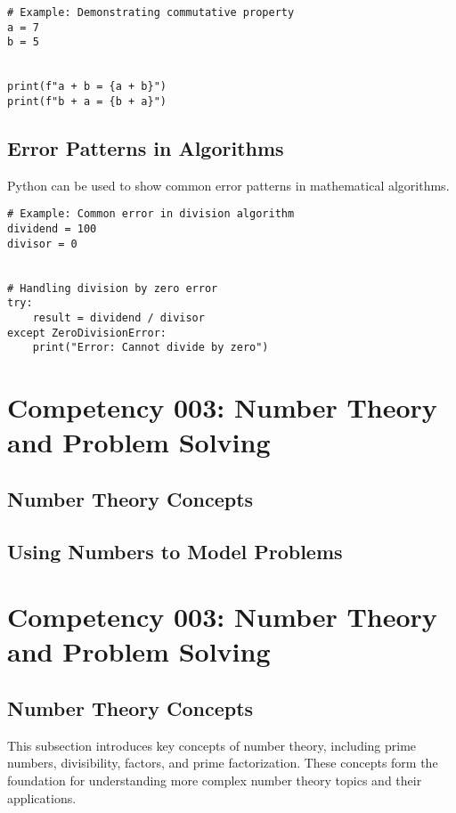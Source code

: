 \documentclass{book}
\begin{document}
\begin{lstlisting}[style=pythonstyle]
# Example: Demonstrating commutative property
a = 7
b = 5


print(f"a + b = {a + b}")
print(f"b + a = {b + a}")
\end{lstlisting}


\subsection{Error Patterns in Algorithms}
Python can be used to show common error patterns in mathematical algorithms.


\begin{lstlisting}[style=pythonstyle]
# Example: Common error in division algorithm
dividend = 100
divisor = 0


# Handling division by zero error
try:
    result = dividend / divisor
except ZeroDivisionError:
    print("Error: Cannot divide by zero")
\end{lstlisting}




\section{Competency 003: Number Theory and Problem Solving}
\subsection{Number Theory Concepts}
\subsection{Using Numbers to Model Problems}


\section{Competency 003: Number Theory and Problem Solving}


\subsection{Number Theory Concepts}
This subsection introduces key concepts of number theory, including prime numbers, divisibility, factors, and prime factorization. These concepts form the foundation for understanding more complex number theory topics and their applications.
\end{document}
